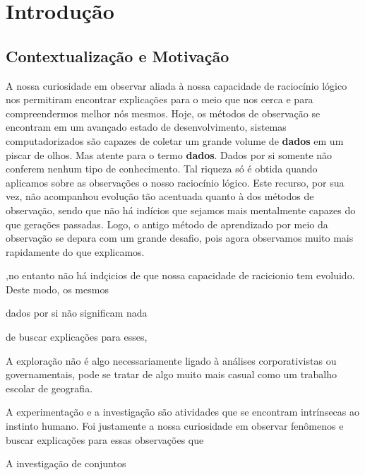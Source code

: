 \chapter{Introdução}

\section{Contextualização e Motivação}

A nossa curiosidade em observar aliada à nossa capacidade de
raciocínio lógico nos permitiram encontrar explicações para
o meio que nos cerca e para compreendermos melhor nós
mesmos. Hoje, os métodos de observação se encontram em um
avançado estado de desenvolvimento, sistemas
computadorizados são capazes de coletar um grande volume de
\textbf{dados} em um piscar de olhos. Mas atente para o
termo \textbf{dados}. Dados por si somente não conferem
nenhum tipo de conhecimento. Tal riqueza só é obtida quando
aplicamos sobre as observações o nosso raciocínio lógico. Este
recurso, por sua vez, não acompanhou evolução tão acentuada
quanto à dos métodos de observação, sendo que não há
indícios que sejamos mais mentalmente capazes do que
gerações passadas. Logo, o antigo método de aprendizado por meio da
observação se depara com um grande desafio, pois agora 
observamos muito mais rapidamente do que explicamos.

,no entanto não há
indçicios de que nossa capacidade de racicionio tem
evoluido. Deste modo, os mesmos 

dados por si não significam nada

de buscar explicações para esses, 

A exploração não é algo necessariamente ligado à análises
corporativistas ou governamentais, pode se tratar de algo
muito mais casual como um trabalho escolar de geografia. 

A experimentação e a investigação são atividades que se
encontram intrínsecas ao instinto humano. Foi justamente a
nossa curiosidade em observar fenômenos e buscar explicações
para essas observações que 






A investigação de conjuntos 


